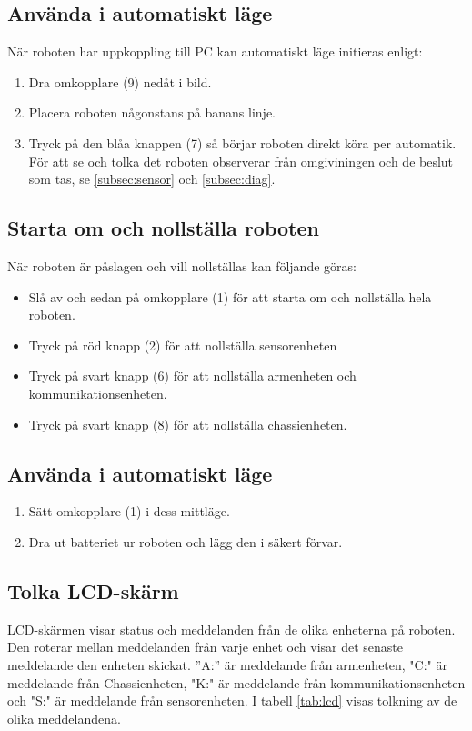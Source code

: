 \documentclass[a4paper,12pt]{article}
\begin{document}
\subsection{Använda i automatiskt läge}
När roboten har uppkoppling till PC kan automatiskt läge initieras enligt:
\begin{enumerate}
    \item Dra omkopplare (9) nedåt i bild.
    \item Placera roboten någonstans på banans linje. 
    \item Tryck på den blåa knappen (7) så börjar roboten direkt köra per automatik. För att se och tolka det roboten observerar från omgiviningen och de beslut som tas, se \ref{subsec:sensor} och \ref{subsec:diag}.
\end{enumerate}

\subsection{Starta om och nollställa roboten}
När roboten är påslagen och vill nollställas kan följande göras:
\begin{itemize}
\item Slå av och sedan på omkopplare (1) för att starta om och nollställa hela roboten.
\item Tryck på röd knapp (2) för att nollställa sensorenheten
\item Tryck på svart knapp (6) för att nollställa armenheten och kommunikationsenheten.
\item Tryck på svart knapp (8) för att nollställa chassienheten. 
\end{itemize}

\subsection{Använda i automatiskt läge}
\begin{enumerate}
    \item Sätt omkopplare (1) i dess mittläge.
    \item Dra ut batteriet ur roboten och lägg den i säkert förvar.
\end{enumerate}

\subsection{Tolka LCD-skärm}
LCD-skärmen visar status och meddelanden från de olika enheterna på roboten. Den roterar mellan meddelanden från varje enhet och visar det senaste meddelande den enheten skickat. ''A:'' är meddelande från armenheten, "C:" är meddelande från Chassienheten, "K:" är meddelande från kommunikationsenheten och "S:" är meddelande från sensorenheten. 
I tabell \ref{tab:lcd} visas tolkning av de olika meddelandena.
\end{document}
